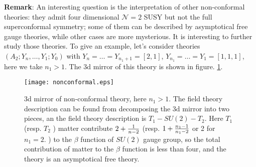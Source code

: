 \documentclass[a4paper,11pt]{article}
\begin{document}
\textbf{Remark}:  An interesting question is the interpretation of other non-conformal theories: they admit four dimensional $\mathcal{N}=2$ SUSY but not the full superconformal 
symmetry; some of them can be described by asymptotical free gauge theories, while other cases are more mysterious. It is interesting to further study 
those theories.  To give an example, let's consider theories $(A_2;Y_n,\ldots, Y_1;Y_0)$ with $Y_n=\ldots=Y_{n_1+1}=[2,1]$, $Y_{n_1}=\ldots=Y_1=[1,1,1]$, here we take $n_1>1$.
The 3d mirror of this theory is shown in figure. \ref{nonconformal}.  
\begin{figure}[h]
\centering
  \texttt{[image: nonconformal.eps]}
  \caption{3d mirror of non-conformal theory, here $n_1>1$. The field theory description can be found from decomposing the 3d mirror into two pieces, an the field theory
 description  is $T_1-SU(2)-T_2$. Here $T_1$ (resp. $T_2$ ) matter contribute $2+{1\over n-2}$ (resp. $1+{n_1-1\over n_{1}-2}$ or 2 for $n_1=2$. ) to the $\beta$ function of $SU(2)$ gauge group, so the total 
 contribution of matter to the $\beta$ function is less than four, and the theory is an asymptotical free theory.}
  \label{nonconformal}
\end{figure}

\newpage
\end{document}
